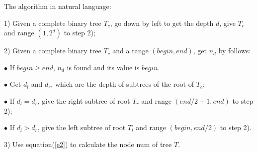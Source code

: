 \documentclass{article}
\begin{document}


    


    
    The algorithm in natural language:

    1) Given a complete binary tree $T_{c}$, go down by left to get the depth $d$, give $T_{c}$ and range $(1, 2^{d})$ to step 2);

    2) Given a complete binary tree $T_{c}$ and a range $(begin, end)$, get $n_{d}$ by follows:

    $\bullet$ If $begin \ge end$, $n_{d}$ is found and its value is $begin$.

    $\bullet$ Get $d_{l}$ and $d_{r}$, which are the depth of subtrees of the root of $T_{c}$;

    $\bullet$ If $d_{l} = d_{r}$, give the right subtree of root $T_{r}$ and range $(end / 2 + 1, end)$ to step 2);

    $\bullet$ If $d_{l} > d_{r}$, give the left subtree of root $T_{l}$ and range $(begin, end / 2)$ to step 2).

    3) Use equation(\ref{e2}) to calculate the node num of tree $T$.
\end{document}
